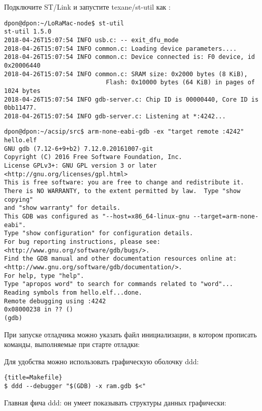 \clearpage
{}\secdown


Подключите ST/Link и запустите texane/st-util как :
\begin{lstlisting}
dpon@dpon:~/LoRaMac-node$ st-util 
st-util 1.5.0
2018-04-26T15:07:54 INFO usb.c: -- exit_dfu_mode
2018-04-26T15:07:54 INFO common.c: Loading device parameters....
2018-04-26T15:07:54 INFO common.c: Device connected is: F0 device, id 0x20006440
2018-04-26T15:07:54 INFO common.c: SRAM size: 0x2000 bytes (8 KiB),
							Flash: 0x10000 bytes (64 KiB) in pages of 1024 bytes
2018-04-26T15:07:54 INFO gdb-server.c: Chip ID is 00000440, Core ID is  0bb11477.
2018-04-26T15:07:54 INFO gdb-server.c: Listening at *:4242...
\end{lstlisting}


\begin{lstlisting}
dpon@dpon:~/acsip/src$ arm-none-eabi-gdb -ex "target remote :4242" hello.elf 
GNU gdb (7.12-6+9+b2) 7.12.0.20161007-git
Copyright (C) 2016 Free Software Foundation, Inc.
License GPLv3+: GNU GPL version 3 or later <http://gnu.org/licenses/gpl.html>
This is free software: you are free to change and redistribute it.
There is NO WARRANTY, to the extent permitted by law.  Type "show copying"
and "show warranty" for details.
This GDB was configured as "--host=x86_64-linux-gnu --target=arm-none-eabi".
Type "show configuration" for configuration details.
For bug reporting instructions, please see:
<http://www.gnu.org/software/gdb/bugs/>.
Find the GDB manual and other documentation resources online at:
<http://www.gnu.org/software/gdb/documentation/>.
For help, type "help".
Type "apropos word" to search for commands related to "word"...
Reading symbols from hello.elf...done.
Remote debugging using :4242
0x08000238 in ?? ()
(gdb) 
\end{lstlisting}


При запуске отладчика можно указать файл инициализации, в котором прописать
команды, выполняемые при старте отладки:



Для удобства можно использовать графическую оболочку ddd:

\begin{lstlisting}{title=Makefile}
$ ddd --debugger "$(GDB) -x ram.gdb $<"
\end{lstlisting}

\clearpage
{}

\medskip
Главная фича ddd: он умеет показывать структуры данных графически:
\medskip


\secup
